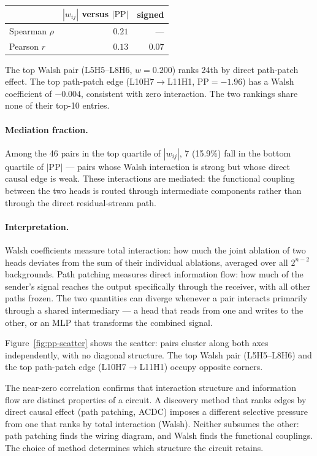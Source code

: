 \medskip

\begin{tabular}{lrr}
\toprule
 & $|w_{ij}|$ versus $|\text{PP}|$ & signed \\
\midrule
Spearman $\rho$  & $0.21$ & --- \\
Pearson $r$      & $0.13$ & $0.07$ \\
\bottomrule
\end{tabular}

\medskip

The top Walsh pair (L5H5--L8H6, $w = 0.200$) ranks 24th by direct
path-patch effect. The top path-patch edge (L10H7$\to$L11H1,
$\text{PP} = -1.96$) has a Walsh coefficient of $-0.004$, consistent
with zero interaction. The two rankings share none of their top-10 entries.

\paragraph{Mediation fraction.}

Among the 46 pairs in the top quartile of $|w_{ij}|$, 7 (15.9\%) fall
in the bottom quartile of $|\text{PP}|$ --- pairs whose Walsh interaction
is strong but whose direct causal edge is weak. These interactions are
mediated: the functional coupling between the two heads is routed through
intermediate components rather than through the direct residual-stream
path.

\paragraph{Interpretation.}

Walsh coefficients measure total interaction: how much the joint
ablation of two heads deviates from the sum of their individual
ablations, averaged over all $2^{n-2}$ backgrounds. Path patching
measures direct information flow: how much of the sender's signal
reaches the output specifically through the receiver, with all other
paths frozen. The two quantities can diverge whenever a pair interacts
primarily through a shared intermediary --- a head that reads from one
and writes to the other, or an MLP that transforms the combined signal.

Figure~\ref{fig:pp-scatter} shows the scatter: pairs cluster along both
axes independently, with no diagonal structure. The top Walsh pair
(L5H5--L8H6) and the top path-patch edge (L10H7$\to$L11H1) occupy
opposite corners.

The near-zero correlation confirms that interaction structure and
information flow are distinct properties of a circuit. A discovery method
that ranks edges by direct causal effect (path patching, ACDC) imposes a
different selective pressure from one that ranks by total interaction
(Walsh). Neither subsumes the other: path patching finds the wiring
diagram, and Walsh finds the functional couplings. The choice of method
determines which structure the circuit retains.


